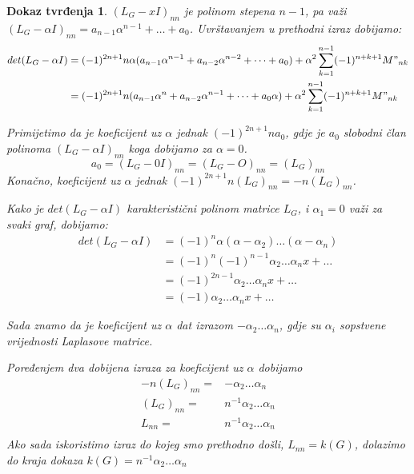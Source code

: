 \documentclass[11pt]{article}
\newtheorem*{custom_proof}{Dokaz tvrđenja}
\begin{document}
\begin{custom_proof}
		$(L_G- xI)_{nn}$ je polinom stepena $n-1$, pa važi $(L_G- \alpha I)_{nn} = a_{n-1}\alpha^{n-1} + \dots + a_0$.
		Uvrštavanjem u prethodni izraz dobijamo:
		\[
			\begin{split}
				det(L_G - \alpha I) &= (-1)^{2n+1} n \alpha (a_{n-1}\alpha^{n-1} + a_{n-2}\alpha^{n-2} + \dots + a_0) + \alpha^2 \sum_{k=1}^{n-1}(-1)^{n+k+1}M"_{nk} \\
									&= (-1)^{2n+1} n (a_{n-1}\alpha^n + a_{n-2}\alpha^{n-1} + \dots + a_0 \alpha) + \alpha^2 \sum_{k=1}^{n-1}(-1)^{n+k+1}M"_{nk}
			\end{split}
		\]

		Primijetimo da je koeficijent uz $\alpha$ jednak $(-1)^{2n+1} n a_0$, gdje je $a_0$ slobodni član polinoma $(L_G- \alpha I)_{nn}$ koga dobijamo za $\alpha=0$.
		\[
		  a_0 = (L_G- 0I)_{nn} = (L_G- O)_{nn} = (L_G)_{nn}
		\]
		Konačno, koeficijent uz $\alpha$ jednak $ (-1)^{2n+1} n (L_G)_{nn} = - n (L_G)_{nn}$.
	
		Kako je $det(L_G - \alpha I)$ karakteristični polinom matrice $L_G$, i $\alpha_1 = 0$ važi za svaki graf, dobijamo:
		\[
			\begin{split}
				det(L_G - \alpha I)  & = (-1)^n \alpha (\alpha - \alpha_2) \dots (\alpha - \alpha_n) \\
									 & = (-1)^n(-1)^{n-1} \alpha_2 \dots \alpha_n x + \dots \\
									 & = (-1)^{2n-1} \alpha_2 \dots \alpha_n x + \dots \\
								     & = (-1) \alpha_2 \dots \alpha_n x + \dots 
									\end{split}
									\]

		Sada znamo da je koeficijent uz $\alpha$ dat izrazom $- \alpha_2 \dots \alpha_n$, gdje su $\alpha_i$ sopstvene vrijednosti Laplasove matrice. 
	
		Poređenjem dva dobijena izraza za koeficijent uz $\alpha$ dobijamo 
		\[
			\begin{split} 
				-n (L_G)_{nn}  = &  - \alpha_2 \dots \alpha_n \\
				(L_G)_{nn}  = & n^{-1} \alpha_2 \dots \alpha_n \\
				 L_{nn} = & n^{-1} \alpha_2 \dots \alpha_n \\ 
			\end{split} 
		\]
		Ako sada iskoristimo izraz do kojeg smo prethodno došli, $ L_{nn} = k(G)$, dolazimo do kraja dokaza $k(G) = n^{-1} \alpha_2 \dots \alpha_n$
		
	\end{custom_proof} 
		
\end{document}
